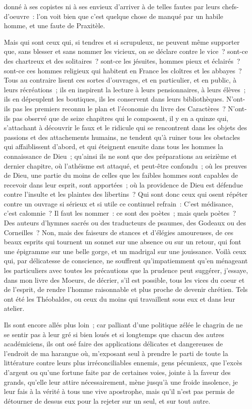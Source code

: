 \documentclass[french,twoside]{book} %
\begin{document}
donné à ses copistes ni à ses envieux d’arriver à de telles fautes par leurs chefs-d’oeuvre : l’on voit bien que c’est quelque chose de manqué par un habile homme, et une faute de Praxitèle.\par
Mais qui sont ceux qui, si tendres et si scrupuleux, ne peuvent même supporter que, sans blesser et sans nommer les vicieux, on se déclare contre le vice ? sont-ce des chartreux et des solitaires ? sont-ce les jésuites, hommes pieux et éclairés ? sont-ce ces hommes religieux qui habitent en France les cloîtres et les abbayes ? Tous au contraire lisent ces sortes d’ouvrages, et en particulier, et en public, à leurs récréations ; ils en inspirent la lecture à leurs pensionnaires, à leurs élèves ; ils en dépeuplent les boutiques, ils les conservent dans leurs bibliothèques. N'ont-ils pas les premiers reconnu le plan et l’économie du livre des Caractères ? N'ont-ils pas observé que de seize chapitres qui le composent, il y en a quinze qui, s’attachant à découvrir le faux et le ridicule qui se rencontrent dans les objets des passions et des attachements humains, ne tendent qu’à ruiner tous les obstacles qui affaiblissent d’abord, et qui éteignent ensuite dans tous les hommes la connaissance de Dieu ; qu’ainsi ils ne sont que des préparations au seizième et dernier chapitre, où l’athéisme est attaqué, et peut-être confondu ; où les preuves de Dieu, une partie du moins de celles que les faibles hommes sont capables de recevoir dans leur esprit, sont apportées ; où la providence de Dieu est défendue contre l’insulte et les plaintes des libertins ? Qui sont donc ceux qui osent répéter contre un ouvrage si sérieux et si utile ce continuel refrain : C'est médisance, c’est calomnie ? Il faut les nommer : ce sont des poètes ; mais quels poètes ? Des auteurs d’hymnes sacrés ou des traducteurs de psaumes, des Godeaux ou des Corneilles ? Non, mais des faiseurs de stances et d’élégies amoureuses, de ces beaux esprits qui tournent un sonnet sur une absence ou sur un retour, qui font une épigramme sur une belle gorge, et un madrigal sur une jouissance. Voilà ceux qui, par délicatesse de conscience, ne souffrent qu’impatiemment qu’en ménageant les particuliers avec toutes les précautions que la prudence peut suggérer, j’essaye, dans mon livre des Moeurs, de décrier, s’il est possible, tous les vices du coeur et de l’esprit, de rendre l’homme raisonnable et plus proche de devenir chrétien. Tels ont été les Théobaldes, ou ceux du moins qui travaillent sous eux et dans leur atelier.\par
Ils sont encore allés plus loin ; car palliant d’une politique zélée le chagrin de ne se sentir pas à leur gré si bien loués et si longtemps que chacun des autres académiciens, ils ont osé faire des applications délicates et dangereuses de l’endroit de ma harangue où, m’exposant seul à prendre le parti de toute la littérature contre leurs plus irréconciliables ennemis, gens pécunieux, que l’excès d’argent ou qu’une fortune faite par de certaines voies, jointe à la faveur des grands, qu’elle leur attire nécessairement, mène jusqu’à une froide insolence, je leur fais à la vérité à tous une vive apostrophe, mais qu’il n’est pas permis de détourner de dessus eux pour la rejeter sur un seul, et sur tout autre.\par
\end{document}

